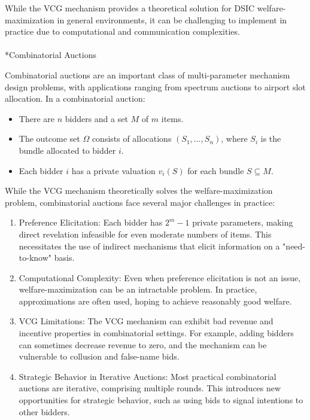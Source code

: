 \documentclass[
  letterpaper,
  numbers=noenddot,
  DIV=11]{scrreprt}
\makeatletter
\let\oldparagraph\paragraph
\renewcommand{\paragraph}{
    \@ifstar
      \xxxParagraphStar
      \xxxParagraphNoStar
  }
\newcommand{\xxxParagraphStar}[1]{\oldparagraph*{#1}\mbox{}}
\newcommand{\xxxParagraphNoStar}[1]{\oldparagraph{#1}\mbox{}}
\theoremstyle{definition}
\theoremstyle{plain}
\theoremstyle{plain}
\theoremstyle{remark}
\makeatother
\begin{document}
While the VCG mechanism provides a theoretical solution for DSIC
welfare-maximization in general environments, it can be challenging to
implement in practice due to computational and communication
complexities.

\paragraph*{Combinatorial Auctions}\label{combinatorial-auctions}

Combinatorial auctions are an important class of multi-parameter
mechanism design problems, with applications ranging from spectrum
auctions to airport slot allocation. In a combinatorial auction:

\begin{itemize}
\item
  There are \(n\) bidders and a set \(M\) of \(m\) items.
\item
  The outcome set \(\Omega\) consists of allocations
  \((S_1, \ldots, S_n)\), where \(S_i\) is the bundle allocated to
  bidder \(i\).
\item
  Each bidder \(i\) has a private valuation \(v_i(S)\) for each bundle
  \(S \subseteq M\).
\end{itemize}

While the VCG mechanism theoretically solves the welfare-maximization
problem, combinatorial auctions face several major challenges in
practice:

\begin{enumerate}
\def\labelenumi{\arabic{enumi}.}
\item
  Preference Elicitation: Each bidder has \(2^m - 1\) private
  parameters, making direct revelation infeasible for even moderate
  numbers of items. This necessitates the use of indirect mechanisms
  that elicit information on a "need-to-know" basis.
\item
  Computational Complexity: Even when preference elicitation is not an
  issue, welfare-maximization can be an intractable problem. In
  practice, approximations are often used, hoping to achieve reasonably
  good welfare.
\item
  VCG Limitations: The VCG mechanism can exhibit bad revenue and
  incentive properties in combinatorial settings. For example, adding
  bidders can sometimes decrease revenue to zero, and the mechanism can
  be vulnerable to collusion and false-name bids.
\item
  Strategic Behavior in Iterative Auctions: Most practical combinatorial
  auctions are iterative, comprising multiple rounds. This introduces
  new opportunities for strategic behavior, such as using bids to signal
  intentions to other bidders.
\end{enumerate}
\end{document}
